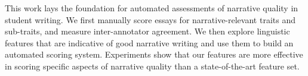 This work lays the foundation for automated assessments of narrative quality in student writing. We first  manually  score  essays for narrative-relevant traits and sub-traits, and measure inter-annotator agreement. We then explore linguistic features that are indicative of good narrative writing and use them to build an automated scoring system. Experiments show that our features are more effective in scoring specific aspects of narrative quality than a state-of-the-art feature set.
